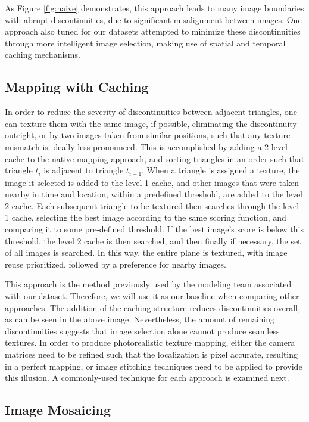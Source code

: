 \documentclass[10pt,twocolumn,letterpaper]{article}
\begin{document}
As Figure \ref{fig:naive} demonstrates, this approach leads to many
image boundaries with abrupt discontinuities, due to significant
misalignment between images. One approach also tuned for our datasets
attempted to minimize these discontinuities through more intelligent
image selection, making use of spatial and temporal caching
mechanisms.

\subsection{Mapping with Caching}
In order to reduce the severity of discontinuities between adjacent
triangles, one can texture them with the same image, if possible,
eliminating the discontinuity outright, or by two images taken from
similar positions, such that any texture mismatch is ideally less
pronounced. This is accomplished by adding a 2-level cache to the
native mapping approach, and sorting triangles in an order such that
triangle $t_i$ is adjacent to triangle $t_{i+1}$. When a
triangle is assigned a texture, the image it selected is added to the
level 1 cache, and other images that were taken nearby in time and
location, within a predefined threshold, are added to the level 2
cache. Each subsequent triangle to be textured then searches through
the level 1 cache, selecting the best image according to the same
scoring function, and comparing it to some pre-defined threshold. If
the best image's score is below this threshold, the level 2 cache is
then searched, and then finally if necessary, the set of all images is
searched. In this way, the entire plane is textured, with image reuse prioritized, followed by a preference for nearby images.

This approach is the method previously used by the modeling team
associated with our dataset. Therefore, we will use it as our baseline
when comparing other approaches.  The addition of the caching
structure reduces discontinuities overall, as can be seen in the above
image. Nevertheless, the amount of remaining discontinuities suggests
that image selection alone cannot produce seamless textures.  In order
to produce photorealistic texture mapping, either the camera matrices
need to be refined such that the localization is pixel accurate,
resulting in a perfect mapping, or image stitching techniques need to
be applied to provide this illusion. A commonly-used technique for
each approach is examined next.




\subsection{Image Mosaicing}
\end{document}
